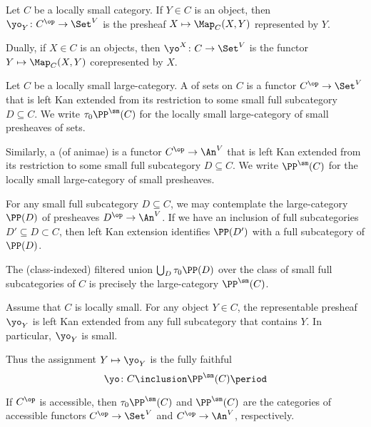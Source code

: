 \begin{eg}
	Let $ C $ be a locally small category.
	If $ Y \in C $ is an object,
	then $ \yo_Y \colon C^{\op} \to \Set^V $ is
	the presheaf $ X \mapsto \Map_C(X,Y) $ represented by $ Y $.

	Dually, if $ X \in C $ is an objects,
	then $ \yo^X \colon C \to \Set^V $ is the functor
	$ Y \mapsto \Map_C(X,Y) $ corepresented by $ X $.
\end{eg}

\begin{definition}
	Let $ C $ be a locally small large-category.
	A  of sets on $ C $ is
	a functor $ C^{\op} \to \Set^V $
	that is left Kan extended from its restriction
	to some small full subcategory $ D \subseteq C $.
	We write $ \tau_0\PP^{\sm}(C) $
	for the locally small large-category
	of small presheaves of sets.
	
	Similarly, a  (of animae) is
	a functor $ C^{\op} \to \An^V $
	that is left Kan extended from its restriction to
	some small full subcategory $ D \subseteq C $.
	We write $ \PP^{\sm}(C) $
	for the locally small large-category
	of small presheaves.
\end{definition}

\begin{nul}
	For any small full subcategory $ D \subseteq C $,
	we may contemplate the large-category $ \PP(D) $
	of presheaves $ D^{\op} \to \An^V $.
	If we have an inclusion of full subcategories
	$ D' \subseteq D \subset C $, then
	left Kan extension identifies $ \PP(D') $ with
	a full subcategory of $ \PP(D) $.
	
	The (class-indexed) filtered union
	$ \bigcup_D \tau_0\PP(D) $
	over the class of small full subcategories of $ C $
	is precisely the large-category $ \PP^{\sm}(C) $.
\end{nul}

\begin{eg}
	Assume that $ C $ is locally small.
	For any object $ Y \in C $,
	the representable presheaf $ \yo_Y $ is left Kan extended
	from any full subcategory that contains $ Y $.
	In particular, $ \yo_Y $ is small.

	Thus the assignment $ Y \mapsto \yo_Y $ is
	the fully faithful 
	\[
		\yo \colon C \inclusion \PP^{\sm}(C) \period
	\]
\end{eg}

\begin{eg}
	If $ C^{\op} $ is accessible,
	then $ \tau_0\PP^{\sm}(C) $ and $ \PP^{\sm}(C) $
	are the categories of accessible functors
	$ C^{\op} \to \Set^V $ and $ C^{\op} \to \An^V $, respectively.
\end{eg}

